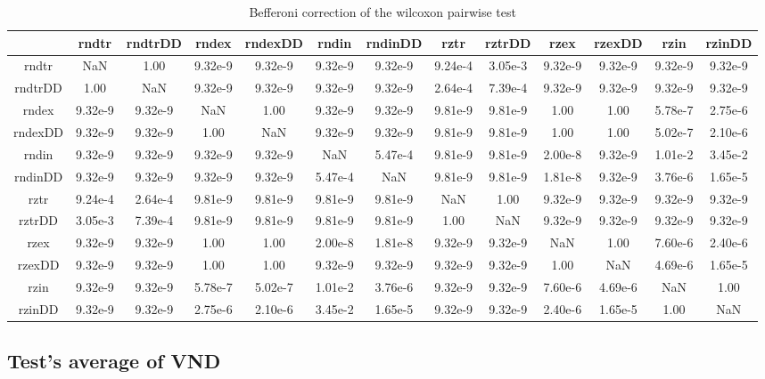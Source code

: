 \documentclass[12pt,a4paper]{article}
\begin{document}
\begin{table}[!h]
\leftskip -2.45cm
{
\footnotesize
\begin{tabular}{|*{13}{c|}}
\hline
~ & rndtr & rndtrDD & rndex & rndexDD & rndin & rndinDD & rztr & rztrDD & rzex & rzexDD & rzin & rzinDD \\
\hline
rndtr & NaN & 1.00 & 9.32e-9 & 9.32e-9 & 9.32e-9 & 9.32e-9 & 9.24e-4 & 3.05e-3 & 9.32e-9 & 9.32e-9 & 9.32e-9 & 9.32e-9 \\
rndtrDD & 1.00 & NaN & 9.32e-9 & 9.32e-9 & 9.32e-9 & 9.32e-9 & 2.64e-4 & 7.39e-4 & 9.32e-9 & 9.32e-9 & 9.32e-9 & 9.32e-9 \\
rndex & 9.32e-9 & 9.32e-9 & NaN & 1.00 & 9.32e-9 & 9.32e-9 & 9.81e-9 & 9.81e-9 & 1.00 & 1.00 & 5.78e-7 & 2.75e-6 \\
rndexDD & 9.32e-9 & 9.32e-9 & 1.00 & NaN & 9.32e-9 & 9.32e-9 & 9.81e-9 & 9.81e-9 & 1.00 & 1.00 & 5.02e-7 & 2.10e-6 \\
rndin & 9.32e-9 & 9.32e-9 & 9.32e-9 & 9.32e-9 & NaN & 5.47e-4 & 9.81e-9 & 9.81e-9 & 2.00e-8 & 9.32e-9 & 1.01e-2 & 3.45e-2 \\
rndinDD & 9.32e-9 & 9.32e-9 & 9.32e-9 & 9.32e-9 & 5.47e-4 & NaN & 9.81e-9 & 9.81e-9 & 1.81e-8 & 9.32e-9 & 3.76e-6 & 1.65e-5 \\
rztr & 9.24e-4 & 2.64e-4 & 9.81e-9 & 9.81e-9 & 9.81e-9 & 9.81e-9 & NaN & 1.00 & 9.32e-9 & 9.32e-9 & 9.32e-9 & 9.32e-9 \\
rztrDD & 3.05e-3 & 7.39e-4 & 9.81e-9 & 9.81e-9 & 9.81e-9 & 9.81e-9 & 1.00 & NaN & 9.32e-9 & 9.32e-9 & 9.32e-9 & 9.32e-9 \\
rzex & 9.32e-9 & 9.32e-9 & 1.00 & 1.00 & 2.00e-8 & 1.81e-8 & 9.32e-9 & 9.32e-9 & NaN & 1.00 & 7.60e-6 & 2.40e-6 \\
rzexDD & 9.32e-9 & 9.32e-9 & 1.00 & 1.00 & 9.32e-9 & 9.32e-9 & 9.32e-9 & 9.32e-9 & 1.00 & NaN & 4.69e-6 & 1.65e-5 \\
rzin & 9.32e-9 & 9.32e-9 & 5.78e-7 & 5.02e-7 & 1.01e-2 & 3.76e-6 & 9.32e-9 & 9.32e-9 & 7.60e-6 & 4.69e-6 & NaN & 1.00 \\
rzinDD & 9.32e-9 & 9.32e-9 & 2.75e-6 & 2.10e-6 & 3.45e-2 & 1.65e-5 & 9.32e-9 & 9.32e-9 & 2.40e-6 & 1.65e-5 & 1.00 & NaN \\
\hline
\end{tabular}
\normalsize
}
\caption{Befferoni correction of the wilcoxon pairwise test}
\end{table}

\subsection{Test's average of VND}
\end{document}
